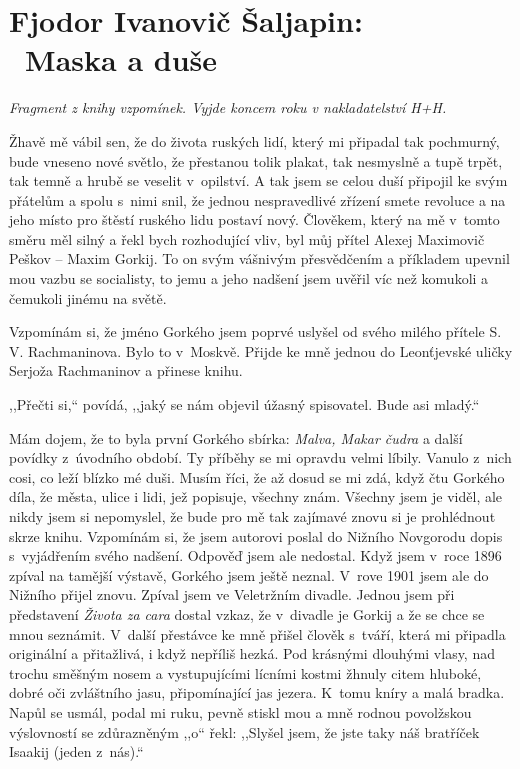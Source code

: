 \section{Fjodor Ivanovič Šaljapin: \\ Maska a duše}

\noindent
\textit{Fragment z knihy vzpomínek. Vyjde koncem roku v nakladatelství H+H. }

\medskip

\noindent
{}
Žhavě mě vábil sen, že do života ruských lidí, který mi připadal tak pochmurný, bude vneseno nové světlo, že přestanou tolik plakat, tak nesmyslně a tupě trpět, tak temně a hrubě se veselit v opilství. A tak jsem se celou duší připojil ke svým přátelům a spolu s nimi snil, že jednou nespravedlivé zřízení smete revoluce a na jeho místo pro štěstí ruského lidu postaví nový. 
Člověkem, který na mě v tomto směru měl silný a řekl bych rozhodující vliv, byl můj přítel Alexej Maximovič Peškov -- Maxim Gorkij. To on svým vášnivým přesvědčením a příkladem upevnil mou vazbu se socialisty, to jemu a jeho nadšení jsem uvěřil víc než komukoli a čemukoli jinému na světě. 

Vzpomínám si, že jméno Gorkého jsem poprvé uslyšel od svého milého přítele S. V. Rachmaninova. Bylo to v Moskvě. Přijde ke mně jednou do Leonťjevské uličky Serjoža Rachmaninov a přinese knihu. 

,,Přečti si,`` povídá, ,,jaký se nám objevil úžasný spisovatel. Bude asi mladý.``

Mám dojem, že to byla první Gorkého sbírka: \textit{Malva, Makar čudra} a další povídky z úvodního období. Ty příběhy se mi opravdu velmi líbily. Vanulo z nich cosi, co leží blízko mé duši. Musím říci, že až dosud se mi zdá, když čtu Gorkého díla, že města, ulice i lidi, jež popisuje, všechny znám. Všechny jsem je viděl, ale nikdy jsem si nepomyslel, že bude pro mě tak zajímavé znovu si je prohlédnout skrze knihu. Vzpomínám si, že jsem autorovi poslal do Nižního Novgorodu dopis s vyjádřením svého nadšení. Odpověď jsem ale nedostal. Když jsem v roce 1896 zpíval na tamější výstavě, Gorkého jsem ještě neznal. V rove 1901 jsem ale do Nižního přijel znovu. Zpíval jsem ve Veletržním divadle. Jednou jsem při představení \textit{Života za cara} dostal vzkaz, že v divadle je Gorkij a že se chce se mnou seznámit. V další přestávce ke mně přišel člověk s tváří, která mi připadla originální a přitažlivá, i když nepříliš hezká. Pod krásnými dlouhými vlasy, nad trochu směšným nosem a vystupujícími lícními kostmi žhnuly citem hluboké, dobré oči zvláštního jasu, připomínající jas jezera. K tomu kníry a malá bradka. Napůl se usmál, podal mi ruku, pevně stiskl mou a mně rodnou povolžskou výslovností se zdůrazněným ,,o`` řekl: ,,Slyšel jsem, že jste taky náš bratříček Isaakij (jeden z nás).``

